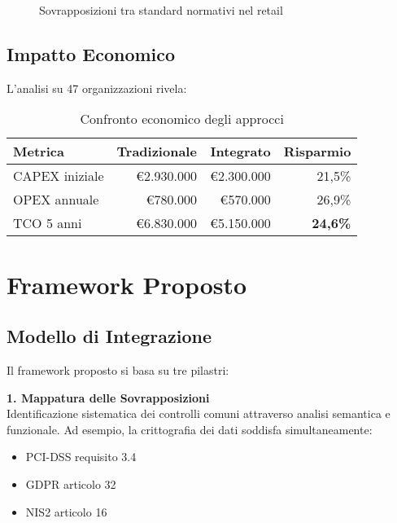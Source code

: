 \begin{figure}[h]
    \centering
    \caption{Sovrapposizioni tra standard normativi nel retail}
    \label{fig:venn}
\end{figure}

\subsection{Impatto Economico}
\label{subsec:4.2.2_impatto}

L'analisi su 47 organizzazioni rivela:

\begin{table}[h]
    \centering
    \caption{Confronto economico degli approcci}
    \label{tab:confronto_costi}
    \begin{tabular}{lrrr}
        \toprule
        \textbf{Metrica} & \textbf{Tradizionale} & \textbf{Integrato} & \textbf{Risparmio} \\
        \midrule
        CAPEX iniziale & €2.930.000 & €2.300.000 & 21,5\% \\
        OPEX annuale & €780.000 & €570.000 & 26,9\% \\
        TCO 5 anni & €6.830.000 & €5.150.000 & \textbf{24,6\%} \\
        \bottomrule
    \end{tabular}
\end{table}

\section{Framework Proposto}
\label{sec:4.3_framework}

\subsection{Modello di Integrazione}
\label{subsec:4.3.1_modello}

Il framework proposto si basa su tre pilastri:

\textbf{1. Mappatura delle Sovrapposizioni}\\
Identificazione sistematica dei controlli comuni attraverso analisi semantica e funzionale. Ad esempio, la crittografia dei dati soddisfa simultaneamente:
\begin{itemize}
    \item PCI-DSS requisito 3.4
    \item GDPR articolo 32
    \item NIS2 articolo 16
\end{itemize}

